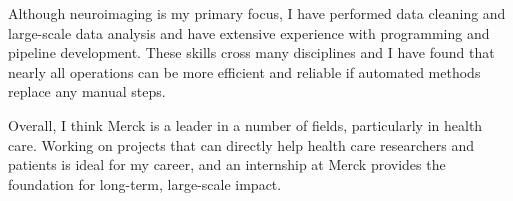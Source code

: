 \documentclass[12pt]{article}
\newcommand{\company}{{Merck }}
\begin{document}
Although neuroimaging is my primary focus, I have performed data cleaning and large-scale data analysis and have extensive experience with programming and pipeline development.   These skills cross many disciplines and I have found that nearly all operations can be more efficient and reliable if automated methods replace any manual steps.

Overall, I think \company is a leader in a number of fields, particularly in health care.  Working on projects that can directly help health care researchers and patients is ideal for my career, and an internship at \company provides the foundation for long-term, large-scale impact.
\end{document}
